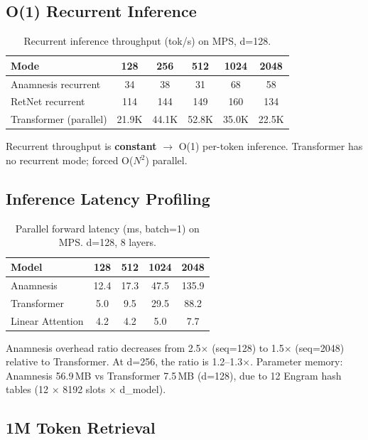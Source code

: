 \documentclass[twocolumn]{article}
\begin{document}
\subsection{O(1) Recurrent Inference}

\begin{table}[h]
\centering
\caption{Recurrent inference throughput (tok/s) on MPS, d=128.}
\begin{tabular}{lccccc}
\toprule
Mode & 128 & 256 & 512 & 1024 & 2048 \\
\midrule
Anamnesis recurrent & 34 & 38 & 31 & 68 & 58 \\
RetNet recurrent & 114 & 144 & 149 & 160 & 134 \\
Transformer (parallel) & 21.9K & 44.1K & 52.8K & 35.0K & 22.5K \\
\bottomrule
\end{tabular}
\end{table}

Recurrent throughput is \textbf{constant} $\rightarrow$ O(1) per-token inference.
Transformer has no recurrent mode; forced O($N^2$) parallel.

\subsection{Inference Latency Profiling}

\begin{table}[h]
\centering
\caption{Parallel forward latency (ms, batch=1) on MPS. d=128, 8 layers.}
\begin{tabular}{lcccc}
\toprule
Model & 128 & 512 & 1024 & 2048 \\
\midrule
Anamnesis & 12.4 & 17.3 & 47.5 & 135.9 \\
Transformer & 5.0 & 9.5 & 29.5 & 88.2 \\
Linear Attention & 4.2 & 4.2 & 5.0 & 7.7 \\
\bottomrule
\end{tabular}
\end{table}

Anamnesis overhead ratio decreases from 2.5$\times$ (seq=128) to 1.5$\times$ (seq=2048)
relative to Transformer. At d=256, the ratio is 1.2--1.3$\times$.
Parameter memory: Anamnesis 56.9\,MB vs Transformer 7.5\,MB (d=128),
due to 12 Engram hash tables (12 $\times$ 8192 slots $\times$ d\_model).

\subsection{1M Token Retrieval}
\end{document}

